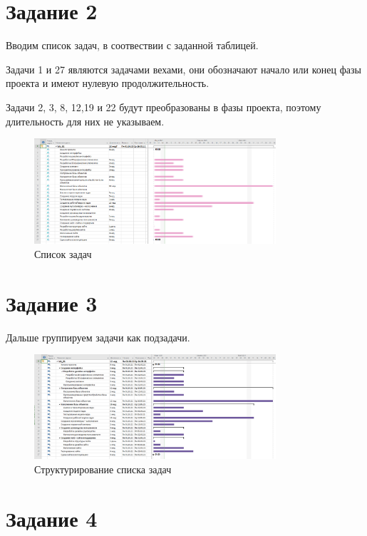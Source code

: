 \section{Задание 2}

Вводим список задач, в соотвествии с заданной таблицей.

Задачи 1 и 27 являются задачами вехами, они обозначают начало или конец фазы проекта и имеют нулевую продолжительность.

Задачи 2, 3, 8, 12,19 и 22 будут преобразованы в фазы проекта, поэтому длительность для них не указываем.

\begin{figure}[H]
	\centering
	\includegraphics[width=0.8\textwidth]{img/content/tasks.png}
	\caption{Список задач}
\end{figure}

\section{Задание 3}

Дальше группируем задачи как подзадачи.

\begin{figure}[H]
	\centering
	\includegraphics[width=0.8\textwidth]{img/content/struct_tasks.png}
	\caption{Структурирование списка задач}
\end{figure}

\section{Задание 4}

